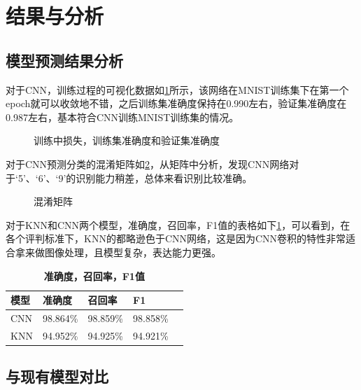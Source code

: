 
\section{结果与分析}

\subsection{模型预测结果分析}

对于CNN，训练过程的可视化数据如\ref{fig4-1}所示，该网络在MNIST训练集下在第一个epoch就可以收敛地不错，之后训练集准确度保持在0.990左右，验证集准确度在0.987左右，基本符合CNN训练MNIST训练集的情况。

\begin{figure}[h!]
    \centering
    
    \caption{训练中损失，训练集准确度和验证集准确度}
    \label{fig4-1}
\end{figure}

对于CNN预测分类的混淆矩阵如\ref{fig4-2}，从矩阵中分析，发现CNN网络对于‘5’、‘6’、‘9’的识别能力稍差，总体来看识别比较准确。

\begin{figure}[h!]
    \centering
    
    \caption{混淆矩阵}
    \label{fig4-2}
\end{figure}

对于KNN和CNN两个模型，准确度，召回率，F1值的表格如下\ref{table4-1}，可以看到，在各个评判标准下，KNN的都略逊色于CNN网络，这是因为CNN卷积的特性非常适合拿来做图像处理，且模型复杂，表达能力更强。

\begin{table}[h]
    \caption{\textbf{准确度，召回率，F1值}}
    \label{table4-1}
    \centering
    \begin{tabularx}{\linewidth}{XXXXX}
        \toprule 
        \textbf{模型}       &   \textbf{准确度}     & \textbf{召回率}   &   \textbf{F1} \\
        \midrule 
        CNN           &   98.864\%     &   98.859\%    &    98.858\% \\
        KNN           &   94.952\%     &   94.925\%    &    94.921\% \\
        \bottomrule
    \end{tabularx}
\end{table}

\subsection{与现有模型对比}

